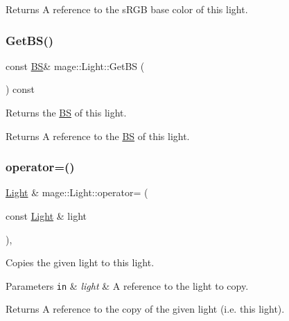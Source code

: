 \begin{DoxyReturn}{Returns}
A reference to the s\+R\+GB base color of this light. 
\end{DoxyReturn}
\hypertarget{classmage_1_1_light_ab2365a76f8f3a2ae2c97263ea556a993}{}\label{classmage_1_1_light_ab2365a76f8f3a2ae2c97263ea556a993} 
\subsubsection{\texorpdfstring{Get\+B\+S()}{GetBS()}}
{\footnotesize\ttfamily const \hyperlink{structmage_1_1_b_s}{BS}\& mage\+::\+Light\+::\+Get\+BS (\begin{DoxyParamCaption}{ }\end{DoxyParamCaption}) const\hspace{0.3cm}{\ttfamily [noexcept]}}

Returns the \hyperlink{structmage_1_1_b_s}{BS} of this light.

\begin{DoxyReturn}{Returns}
A reference to the \hyperlink{structmage_1_1_b_s}{BS} of this light. 
\end{DoxyReturn}
\hypertarget{classmage_1_1_light_a853a41931d798c85fe05a55f69883874}{}\label{classmage_1_1_light_a853a41931d798c85fe05a55f69883874} 
\subsubsection{\texorpdfstring{operator=()}{operator=()}\hspace{0.1cm}{\footnotesize\ttfamily [1/2]}}
{\footnotesize\ttfamily \hyperlink{classmage_1_1_light}{Light} \& mage\+::\+Light\+::operator= (\begin{DoxyParamCaption}\item[{const \hyperlink{classmage_1_1_light}{Light} \&}]{light }\end{DoxyParamCaption})\hspace{0.3cm}{\ttfamily [default]}, {\ttfamily [noexcept]}}

Copies the given light to this light.


\begin{DoxyParams}[1]{Parameters}
\mbox{\tt in}  & {\em light} & A reference to the light to copy. \\
\hline
\end{DoxyParams}
\begin{DoxyReturn}{Returns}
A reference to the copy of the given light (i.\+e. this light). 
\end{DoxyReturn}
\hypertarget{classmage_1_1_light_ab04daa2ff8f756310d8133470a625a26}{}\label{classmage_1_1_light_ab04daa2ff8f756310d8133470a625a26} 
